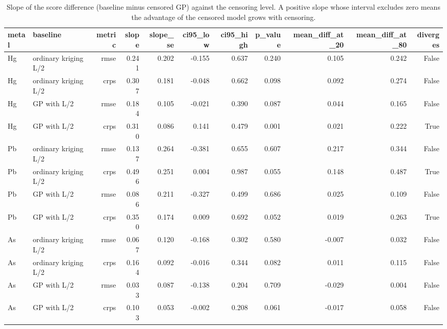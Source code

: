 \begin{table}[htbp]
\centering
\caption{Slope of the score difference (baseline minus censored GP) against the censoring level. A positive slope whose interval excludes zero means the advantage of the censored model grows with censoring.}
\label{tab:slopes}
\footnotesize
\begin{tabular}{llrrrrrrrrr}
\toprule
metal & baseline & metric & slope & slope\_se & ci95\_low & ci95\_high & p\_value & mean\_diff\_at\_20 & mean\_diff\_at\_80 & diverges \\
\midrule
Hg & ordinary kriging L/2 & rmse & 0.241 & 0.202 & -0.155 & 0.637 & 0.240 & 0.105 & 0.242 & False \\
Hg & ordinary kriging L/2 & crps & 0.307 & 0.181 & -0.048 & 0.662 & 0.098 & 0.092 & 0.274 & False \\
Hg & GP with L/2 & rmse & 0.184 & 0.105 & -0.021 & 0.390 & 0.087 & 0.044 & 0.165 & False \\
Hg & GP with L/2 & crps & 0.310 & 0.086 & 0.141 & 0.479 & 0.001 & 0.021 & 0.222 & True \\
Pb & ordinary kriging L/2 & rmse & 0.137 & 0.264 & -0.381 & 0.655 & 0.607 & 0.217 & 0.344 & False \\
Pb & ordinary kriging L/2 & crps & 0.496 & 0.251 & 0.004 & 0.987 & 0.055 & 0.148 & 0.487 & True \\
Pb & GP with L/2 & rmse & 0.086 & 0.211 & -0.327 & 0.499 & 0.686 & 0.025 & 0.109 & False \\
Pb & GP with L/2 & crps & 0.350 & 0.174 & 0.009 & 0.692 & 0.052 & 0.019 & 0.263 & True \\
As & ordinary kriging L/2 & rmse & 0.067 & 0.120 & -0.168 & 0.302 & 0.580 & -0.007 & 0.032 & False \\
As & ordinary kriging L/2 & crps & 0.164 & 0.092 & -0.016 & 0.344 & 0.082 & 0.011 & 0.115 & False \\
As & GP with L/2 & rmse & 0.033 & 0.087 & -0.138 & 0.204 & 0.709 & -0.029 & 0.004 & False \\
As & GP with L/2 & crps & 0.103 & 0.053 & -0.002 & 0.208 & 0.061 & -0.017 & 0.058 & False \\
\bottomrule
\end{tabular}
\end{table}
